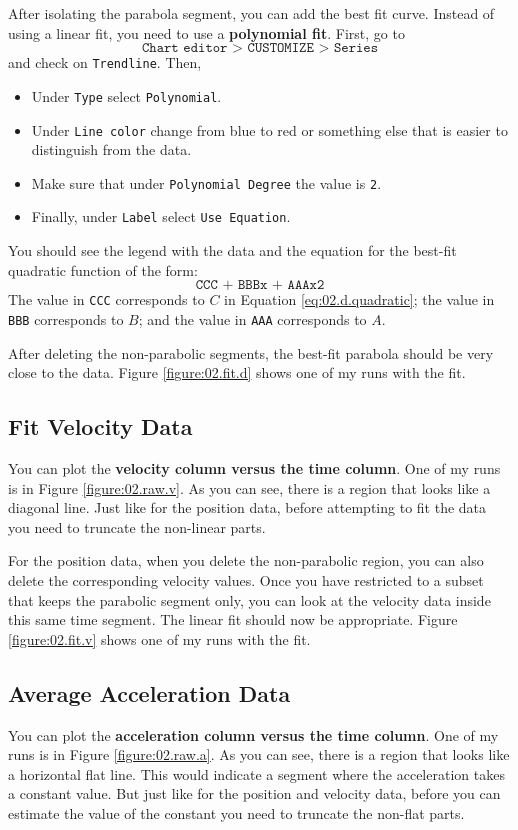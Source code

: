 After isolating the parabola segment, you can add the best fit curve. Instead of using a linear fit, you need to use a \textbf{polynomial fit}. First, go to
\begin{equation}
    \texttt{Chart editor > CUSTOMIZE > Series}
\end{equation}
and check on \texttt{Trendline}. Then,
\begin{itemize}
    \item Under \texttt{Type} select \texttt{Polynomial}.
    \item Under \texttt{Line color} change from blue to red or something else that is easier to distinguish from the data.
    \item Make sure that under \texttt{Polynomial Degree} the value is \texttt{2}.
    \item Finally, under \texttt{Label} select \texttt{Use Equation}.
\end{itemize}
You should see the legend with the data and the equation for the best-fit quadratic function of the form:
\begin{equation}
    \texttt{CCC + BBBx + AAAx\^{}2}
\end{equation}
The value in \texttt{CCC} corresponds to $C$ in Equation \ref{eq:02.d.quadratic}; the value in \texttt{BBB} corresponds to $B$; and the value in \texttt{AAA} corresponds to $A$.

After deleting the non-parabolic segments, the best-fit parabola should be very close to the data. Figure \ref{figure:02.fit.d} shows one of my runs with the fit.
%
\subsection{Fit Velocity Data}
%
You can plot the \textbf{velocity column versus the time column}. One of my runs is in Figure \ref{figure:02.raw.v}. As you can see, there is a region that looks like a diagonal line. Just like for the position data, before attempting to fit the data you need to truncate the non-linear parts.

For the position data, when you delete the non-parabolic region, you can also delete the corresponding velocity values. Once you have restricted to a subset that keeps the parabolic segment only, you can look at the velocity data inside this same time segment. The linear fit should now be appropriate. Figure \ref{figure:02.fit.v} shows one of my runs with the fit.
%
\subsection{Average Acceleration Data}
%
You can plot the \textbf{acceleration column versus the time column}. One of my runs is in Figure \ref{figure:02.raw.a}. As you can see, there is a region that looks like a horizontal flat line. This would indicate a segment where the acceleration takes a constant value. But just like for the position and velocity data, before you can estimate the value of the constant you need to truncate the non-flat parts.

